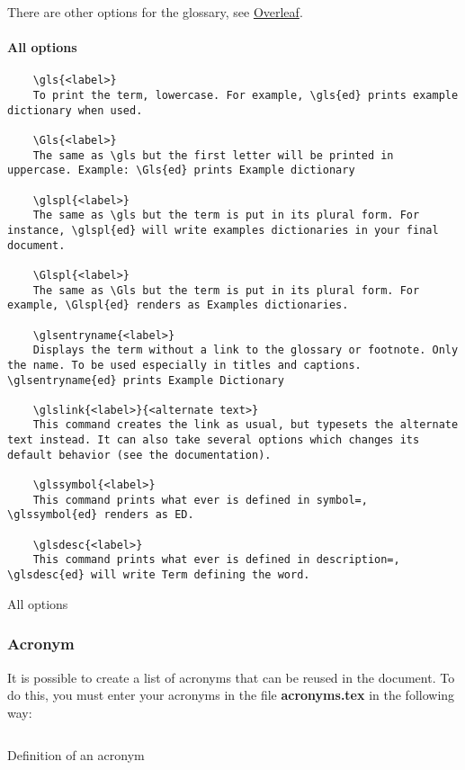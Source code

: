 There are other options for the glossary, see \href{https://fr.overleaf.com/learn/latex/Glossaries}{Overleaf}.

\paragraph{All options}

\begin{code}
    \begin{verbatim}
    \gls{<label>}
    To print the term, lowercase. For example, \gls{ed} prints example dictionary when used.

    \Gls{<label>}
    The same as \gls but the first letter will be printed in uppercase. Example: \Gls{ed} prints Example dictionary

    \glspl{<label>}
    The same as \gls but the term is put in its plural form. For instance, \glspl{ed} will write examples dictionaries in your final document.

    \Glspl{<label>}
    The same as \Gls but the term is put in its plural form. For example, \Glspl{ed} renders as Examples dictionaries.

    \glsentryname{<label>}
    Displays the term without a link to the glossary or footnote. Only the name. To be used especially in titles and captions. \glsentryname{ed} prints Example Dictionary

    \glslink{<label>}{<alternate text>}
    This command creates the link as usual, but typesets the alternate text instead. It can also take several options which changes its default behavior (see the documentation).

    \glssymbol{<label>}
    This command prints what ever is defined in symbol=, \glssymbol{ed} renders as ED.

    \glsdesc{<label>}
    This command prints what ever is defined in description=, \glsdesc{ed} will write Term defining the word.
    \end{verbatim}
    \caption{All options}
\end{code}

\subsubsection{Acronym} \label{acronym}
It is possible to create a list of acronyms that can be reused in the document.
To do this, you must enter your acronyms in the file \textbf{acronyms.tex} in the following way:
\begin{code}
    \inputminted{latex}{./acronyms.tex}
    \caption{Definition of an acronym}
\end{code}


